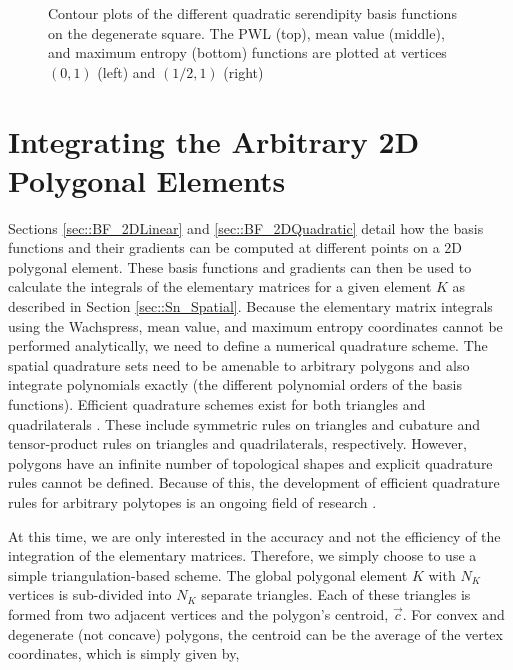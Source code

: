 \begin{figure}
{\begin{subfigure}[b]{0.375\textwidth}
	\end{subfigure}
}
\vspace{2mm}
\caption{Contour plots of the different quadratic serendipity basis functions on the degenerate square. The PWL (top), mean value (middle), and maximum entropy (bottom) functions are plotted at vertices $(0,1)$ (left) and $(1/2,1)$ (right)}
\label{fig::2DQuadSer_degsquare_basis_functions}
\end{figure}


\section{Integrating the Arbitrary 2D Polygonal Elements}
\label{sec::BF_2DIntegration}

Sections \ref{sec::BF_2DLinear} and \ref{sec::BF_2DQuadratic} detail how the basis functions and their gradients can be computed at different points on a 2D polygonal element. These basis functions and gradients can then be used to calculate the integrals of the elementary matrices for a given element $K$ as described in Section \ref{sec::Sn_Spatial}. Because the elementary matrix integrals using the Wachspress, mean value, and maximum entropy coordinates cannot be performed analytically, we need to define a numerical quadrature scheme. The spatial quadrature sets need to be amenable to arbitrary polygons and also integrate polynomials exactly (the different polynomial orders of the basis functions). Efficient quadrature schemes exist for both triangles and quadrilaterals \cite{silvester1970symmetric,dunavant1985high,wandzurat2003symmetric,lyness1994survey,cools1987construction}. These include symmetric rules on triangles and cubature and tensor-product rules on triangles and quadrilaterals, respectively. However, polygons have an infinite number of topological shapes and explicit quadrature rules cannot be defined. Because of this, the development of efficient quadrature rules for arbitrary polytopes is an ongoing field of research \cite{nooijen1990symmetric,dasgupta2003integration,mousavi2010generalized}.

At this time, we are only interested in the accuracy and not the efficiency of the integration of the elementary matrices. Therefore, we simply choose to use a simple triangulation-based scheme. The global polygonal element $K$ with $N_K$ vertices is sub-divided into $N_K$ separate triangles. Each of these triangles is formed from two adjacent vertices and the polygon's centroid, $\vec{c}$. For convex and degenerate (not concave) polygons, the centroid can be the average of the vertex coordinates, which is simply given by,

